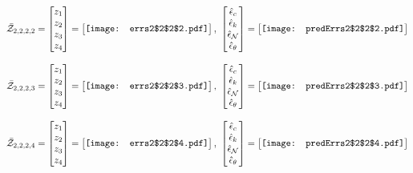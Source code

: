 \documentclass[12pt]{article}
\begin{document}
\begin{gather*}
\bar{\mathcal{Z}}_{2,2,2,2}=\begin{bmatrix}
z_1\\
z_2\\
z_3\\
z_4
 \end{bmatrix}= \begin{bmatrix}
\vcenter{\hbox{\texttt{[image: errs2\$2\$2\$2.pdf]}}}
 \end{bmatrix},\,\, \begin{bmatrix}
\hat{\epsilon}_c\\\hat{\epsilon}_k\\\hat{\epsilon}_\mathcal{N}\\\hat{\epsilon}_\theta
 \end{bmatrix}=\begin{bmatrix}
\vcenter{\hbox{\texttt{[image: predErrs2\$2\$2\$2.pdf]}}}
 \end{bmatrix}
\end{gather*}


\begin{gather*}
\bar{\mathcal{Z}}_{2,2,2,3}=\begin{bmatrix}
z_1\\
z_2\\
z_3\\
z_4
 \end{bmatrix}= \begin{bmatrix}
\vcenter{\hbox{\texttt{[image: errs2\$2\$2\$3.pdf]}}}
 \end{bmatrix},\,\, \begin{bmatrix}
\hat{\epsilon}_c\\\hat{\epsilon}_k\\\hat{\epsilon}_\mathcal{N}\\\hat{\epsilon}_\theta
 \end{bmatrix}=\begin{bmatrix}
\vcenter{\hbox{\texttt{[image: predErrs2\$2\$2\$3.pdf]}}}
 \end{bmatrix}
\end{gather*}


\begin{gather*}
\bar{\mathcal{Z}}_{2,2,2,4}=\begin{bmatrix}
z_1\\
z_2\\
z_3\\
z_4
 \end{bmatrix}= \begin{bmatrix}
\vcenter{\hbox{\texttt{[image: errs2\$2\$2\$4.pdf]}}}
 \end{bmatrix},\,\, \begin{bmatrix}
\hat{\epsilon}_c\\\hat{\epsilon}_k\\\hat{\epsilon}_\mathcal{N}\\\hat{\epsilon}_\theta
 \end{bmatrix}=\begin{bmatrix}
\vcenter{\hbox{\texttt{[image: predErrs2\$2\$2\$4.pdf]}}}
 \end{bmatrix}
\end{gather*}
\end{document}
